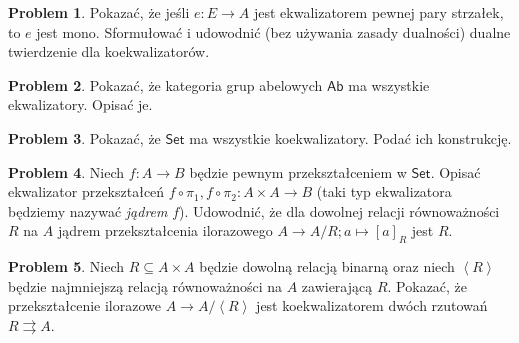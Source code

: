\documentclass[10pt]{amsart}
\theoremstyle{plain}
\theoremstyle{definition}
\newtheorem{problem}{Problem}
\numberwithin{equation}{section}
\begin{document}
\begin{problem}
Pokazać, że jeśli $e:E\to A$ jest ekwalizatorem pewnej pary strzałek, to $e$ jest mono. Sformułować i udowodnić (bez używania zasady dualności) dualne twierdzenie dla koekwalizatorów. 
\end{problem}

\begin{problem}
Pokazać, że kategoria grup abelowych $\mathsf{Ab}$ ma wszystkie ekwalizatory. Opisać je.  
\end{problem}

\begin{problem}
Pokazać, że $\mathsf{Set}$ ma wszystkie koekwalizatory. Podać ich konstrukcję.
\end{problem}
\begin{problem}
Niech $f:A\to B$ będzie pewnym przekształceniem w $\mathsf{Set}$. Opisać ekwalizator przekształceń $f\circ \pi_1, f\circ \pi_2:A\times A\to B$ (taki typ ekwalizatora będziemy nazywać \emph{jądrem} $f$). Udowodnić, że dla dowolnej relacji równoważności $R$ na $A$ jądrem  przekształcenia ilorazowego $A\to A/R; a\mapsto [a]_R$ jest $R$.
\end{problem}
\begin{problem}
Niech $R\subseteq A\times A$ będzie dowolną relacją binarną oraz niech $\left < R\right >$ będzie najmniejszą relacją równoważności na $A$ zawierającą $R$. Pokazać, że przekształcenie ilorazowe $A\to A/\left < R \right >$ jest koekwalizatorem dwóch rzutowań $R\rightrightarrows A$. 
\end{problem}
\end{document}
